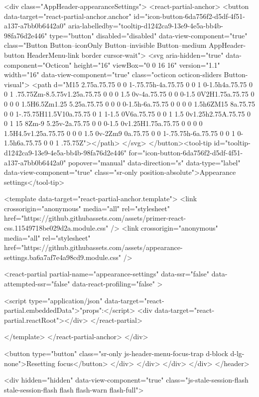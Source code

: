                 <div class="AppHeader-appearanceSettings">
    <react-partial-anchor>
      <button data-target="react-partial-anchor.anchor" id="icon-button-6da756f2-d5df-4f51-a137-a7bb0b6442a0" aria-labelledby="tooltip-d1242ca9-13e9-4e5a-bb4b-98fa76d2e446" type="button" disabled="disabled" data-view-component="true" class="Button Button--iconOnly Button--invisible Button--medium AppHeader-button HeaderMenu-link border cursor-wait">  <svg aria-hidden="true" data-component="Octicon" height="16" viewBox="0 0 16 16" version="1.1" width="16" data-view-component="true" class="octicon octicon-sliders Button-visual">
    <path d="M15 2.75a.75.75 0 0 1-.75.75h-4a.75.75 0 0 1 0-1.5h4a.75.75 0 0 1 .75.75Zm-8.5.75v1.25a.75.75 0 0 0 1.5 0v-4a.75.75 0 0 0-1.5 0V2H1.75a.75.75 0 0 0 0 1.5H6.5Zm1.25 5.25a.75.75 0 0 0 0-1.5h-6a.75.75 0 0 0 0 1.5h6ZM15 8a.75.75 0 0 1-.75.75H11.5V10a.75.75 0 1 1-1.5 0V6a.75.75 0 0 1 1.5 0v1.25h2.75A.75.75 0 0 1 15 8Zm-9 5.25v-2a.75.75 0 0 0-1.5 0v1.25H1.75a.75.75 0 0 0 0 1.5H4.5v1.25a.75.75 0 0 0 1.5 0v-2Zm9 0a.75.75 0 0 1-.75.75h-6a.75.75 0 0 1 0-1.5h6a.75.75 0 0 1 .75.75Z"></path>
</svg>
</button><tool-tip id="tooltip-d1242ca9-13e9-4e5a-bb4b-98fa76d2e446" for="icon-button-6da756f2-d5df-4f51-a137-a7bb0b6442a0" popover="manual" data-direction="s" data-type="label" data-view-component="true" class="sr-only position-absolute">Appearance settings</tool-tip>

      <template data-target="react-partial-anchor.template">
        <link crossorigin="anonymous" media="all" rel="stylesheet" href="https://github.githubassets.com/assets/primer-react-css.11549718be029d2a.module.css" />
<link crossorigin="anonymous" media="all" rel="stylesheet" href="https://github.githubassets.com/assets/appearance-settings.ba6a7af7e4a98cd9.module.css" />

<react-partial
  partial-name="appearance-settings"
  data-ssr="false"
  data-attempted-ssr="false"
  data-react-profiling="false"
>
  
  <script type="application/json" data-target="react-partial.embeddedData">{"props":{}}</script>
  <div data-target="react-partial.reactRoot"></div>
</react-partial>


      </template>
    </react-partial-anchor>
  </div>

          <button type="button" class="sr-only js-header-menu-focus-trap d-block d-lg-none">Resetting focus</button>
        </div>
      </div>
    </div>
  </div>
</header>

      <div hidden="hidden" data-view-component="true" class="js-stale-session-flash stale-session-flash flash flash-warn flash-full">
  
